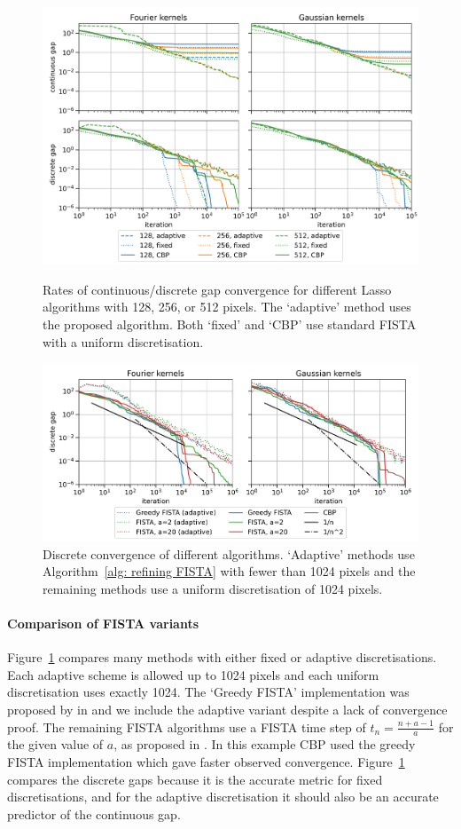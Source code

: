 \documentclass[smallextended]{svjour3}
\newcommand{\1}{\F{1}}
\begin{document}
	\begin{figure}\centering
		\includegraphics[width=.84\textwidth]{lasso_ndofs_convergence}
		\caption{Rates of continuous/discrete gap convergence for different Lasso algorithms with 128, 256, or 512 pixels. The `adaptive' method uses the proposed algorithm. Both `fixed' and `CBP' use standard FISTA with a uniform discretisation.}\label{fig: convergence with ndofs}
		
		\vspace*{\floatsep}
		
		\includegraphics[width=.84\textwidth]{lasso_convergence_short}
		\caption{Discrete convergence of different algorithms. `Adaptive' methods use Algorithm~\ref{alg: refining FISTA} with fewer than 1024 pixels and the remaining methods use a uniform discretisation of 1024 pixels.}\label{fig: convergence with method}
	\end{figure}
	
	
	\paragraph{Comparison of FISTA variants}
	Figure~\ref{fig: convergence with method} compares many methods with either fixed or adaptive discretisations. Each adaptive scheme is allowed up to 1024 pixels and each uniform discretisation uses exactly 1024. The `Greedy FISTA' implementation was proposed by in \cite{Liang2018} and we include the adaptive variant despite a lack of convergence proof. The remaining FISTA algorithms use a FISTA time step of $t_n = \frac{n+a-1}{a}$ for the given value of $a$, as proposed in \cite{Chambolle2015}. In this example CBP used the greedy FISTA implementation which gave faster observed convergence. Figure~\ref{fig: convergence with method} compares the discrete gaps because it is the accurate metric for fixed discretisations, and for the adaptive discretisation it should also be an accurate predictor of the continuous gap. 
	
\end{document}
